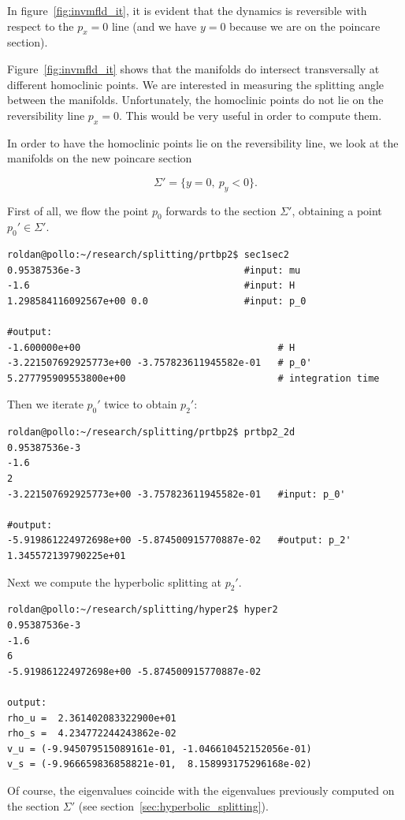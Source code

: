 \documentclass[a4paper]{amsart}
\theoremstyle{remark}
\begin{document}
In figure~\ref{fig:invmfld_it}, it is evident that the dynamics is
reversible with respect to the $p_x=0$ line (and we have $y=0$ because
we are on the poincare section).

Figure~\ref{fig:invmfld_it} shows that the manifolds do intersect
transversally at different homoclinic points. 
We are interested in measuring the splitting angle between the
manifolds.
Unfortunately, the homoclinic points do not lie on the reversibility
line $p_x=0$. This would be very useful in order to compute them.

In order to have the homoclinic points lie on the reversibility line,
we look at the manifolds on the new poincare section

\[ \Sigma ' = \{y=0,\ p_y<0\}. \]

First of all, we flow the point $p_0$ forwards to the section $\Sigma'$,
obtaining a point $p_0'\in \Sigma'$.

\begin{verbatim}
roldan@pollo:~/research/splitting/prtbp2$ sec1sec2 
0.95387536e-3                             #input: mu
-1.6                                      #input: H
1.298584116092567e+00 0.0                 #input: p_0

#output:
-1.600000e+00                                   # H
-3.221507692925773e+00 -3.757823611945582e-01   # p_0'
5.277795909553800e+00                           # integration time
\end{verbatim}

Then we iterate $p_0'$ twice to obtain $p_2'$:
\begin{verbatim}
roldan@pollo:~/research/splitting/prtbp2$ prtbp2_2d
0.95387536e-3 
-1.6 
2
-3.221507692925773e+00 -3.757823611945582e-01   #input: p_0'

#output:
-5.919861224972698e+00 -5.874500915770887e-02   #output: p_2'
1.345572139790225e+01
\end{verbatim}

Next we compute the hyperbolic splitting at $p_2'$.
\begin{verbatim}
roldan@pollo:~/research/splitting/hyper2$ hyper2
0.95387536e-3 
-1.6 
6 
-5.919861224972698e+00 -5.874500915770887e-02

output:
rho_u =  2.361402083322900e+01
rho_s =  4.234772244243862e-02
v_u = (-9.945079515089161e-01, -1.046610452152056e-01)
v_s = (-9.966659836858821e-01,  8.158993175296168e-02)
\end{verbatim}
Of course, the eigenvalues coincide with the eigenvalues previously
computed on the section $\Sigma'$ (see
section~\ref{sec:hyperbolic_splitting}).
\end{document}
